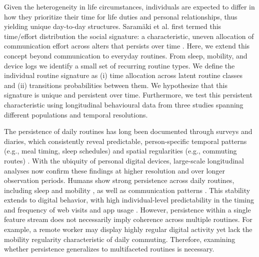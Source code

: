 \documentclass[pdflatex,sn-vancouver,Numbered]{bst/sn-jnl}%
\theoremstyle{thmstyleone}%
\theoremstyle{thmstyletwo}%
\theoremstyle{thmstylethree}%
\begin{document}
Given the heterogeneity in life circumstances, individuals are expected to differ in how they prioritize their time for life duties and personal relationships, thus yielding unique day-to-day structures. Saramäki et al. first termed this time/effort distribution the social signature: a characteristic, uneven allocation of communication effort across alters that persists over time \cite{saramaki2014persistence}. Here, we extend this concept beyond communication to everyday routines. From sleep, mobility, and device logs we identify a small set of recurring routine types. We define the individual routine signature as (i) time allocation across latent routine classes and (ii) transitions probabilities between them. We hypothesize that this signature is unique and persistent over time. Furthermore, we test this persistent characteristic using longitudinal behavioural data from three studies spanning different populations and temporal resolutions.

The persistence of daily routines has long been documented through surveys and diaries, which consistently reveal predictable, person-specific temporal patterns (e.g., meal timing, sleep schedules) and spatial regularities (e.g., commuting routes) \cite{hansonSystematicVariabilityRepetitious1988a, monk1990social, soehnerCircadianPreferenceSleepWake2011}. With the ubiquity of personal digital devices, large-scale longitudinal analyses now confirm these findings at higher resolution and over longer observation periods. Humans show strong persistence across daily routines, including sleep and mobility \cite{songLimitsPredictabilityHuman2010, song2010modelling, alessandretti2020scales}, as well as communication patterns \cite{saramaki2014persistence, aledavoodDailyRhythmsMobile2015a, heydari2018multichannel, loriteLongTermEvolutionEmail2016}. This stability extends to digital behavior, with high individual-level predictability in the timing and frequency of web visits \cite{barbosa2016returners, hu2018life, kulshrestha2021web} and app usage \cite{malmi2016you, kosinski2013private, petersSocialMediaUse2024, shawBehavioralConsistencyDigital2022}. However, persistence within a single feature stream does not necessarily imply coherence across multiple routines. For example, a remote worker may display highly regular digital activity yet lack the mobility regularity characteristic of daily commuting. Therefore, examining whether persistence generalizes to multifaceted routines is necessary.
\end{document}
